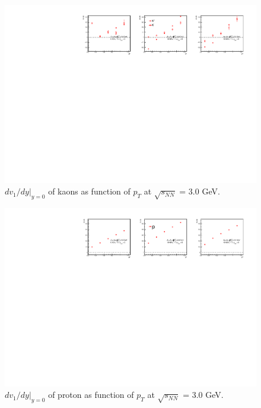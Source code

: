 \begin{figure}[hbt!]
\centering
\includegraphics[width=0.95\linewidth]{figures/chapter03/3gev_kaonp_v1Slope_pT.pdf}
\caption{$dv_1/dy|_{y=0}$ of kaons as function of $p_T$ at $\sqrt{s_{NN}}$ = 3.0 GeV.}
\label{fig:3gev_kaon_v1Slope_pt}
\end{figure}

\begin{figure}[hbt!]
\centering
\includegraphics[width=0.95\linewidth]{figures/chapter03/3gev_protonp_v1Slope_pT.pdf}
\caption{$dv_1/dy|_{y=0}$ of proton as function of $p_T$ at $\sqrt{s_{NN}}$ = 3.0 GeV.}
\label{fig:3gev_proton_v1Slope_pt}
\end{figure}

